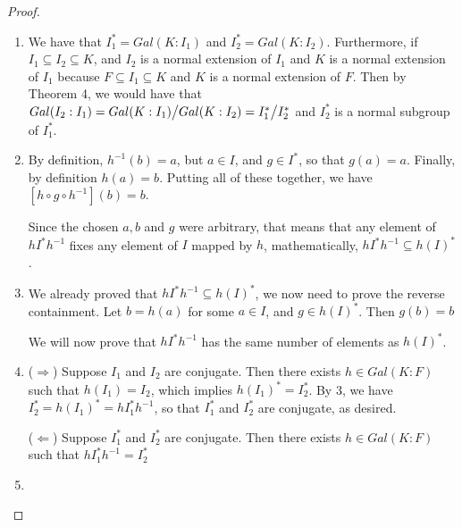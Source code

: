 \begin{proof}
 \begin{enumerate}
     \item We have that $I_1^\ast=Gal(K:I_1)$ and $I_2^\ast=Gal(K:I_2)$. Furthermore, if $I_1\subseteq I_2\subseteq K$, and $I_2$ is a normal extension of $I_1$ and $K$ is a normal extension of $I_1$ because $F\subseteq I_1\subseteq K$ and $K$ is a normal extension of $F$. Then by Theorem 4, we would have that $Gal(I_2:I_1)={\textstyle Gal(K:I_1)}\big/{\textstyle Gal(K:I_2)}={\textstyle I_1^\ast}\big/{\textstyle I_2^\ast}$ and $I_2^\ast$ is a normal subgroup of $I_1^\ast$.
     \item By definition, $h^{-1}(b)=a$, but $a\in I$, and $g\in I^\ast$, so that $g(a)=a$. Finally, by definition $h(a)=b$. Putting all of these together, we have $[h\circ g\circ h^{-1}](b)=b$. 

     Since the chosen $a, b$ and $g$ were arbitrary, that means that any element of $hI^\ast h^{-1}$ fixes any element of $I$ mapped by $h$, mathematically, $hI^\ast h^{-1}\subseteq h(I)^\ast$.
     \item We already proved that $hI^\ast h^{-1}\subseteq h(I)^\ast$, we now need to prove the reverse containment. Let $b=h(a)$ for some $a\in I$, and $g\in h(I)^\ast$. Then $g(b)=b$

     We will now prove that $hI^\ast h^{-1}$ has the same number of elements as $h(I)^\ast$. 
     \item ($\Rightarrow$) Suppose $I_1$ and $I_2$ are conjugate. Then there exists $h\in Gal(K:F)$ such that $h(I_1)=I_2$, which implies $h(I_1)^\ast=I_2^\ast$. By 3, we have $I_2^\ast= h(I_1)^\ast= hI_1^\ast h^{-1}$, so that $I_1^\ast$ and $I_2^\ast$ are conjugate, as desired.

     ($\Leftarrow$) Suppose $I_1^\ast$ and $I_2^\ast$ are conjugate. Then there exists $h\in Gal(K:F)$ such that $hI_1^\ast h^{-1}=I_2^\ast$
    \item
 \end{enumerate}
\end{proof}